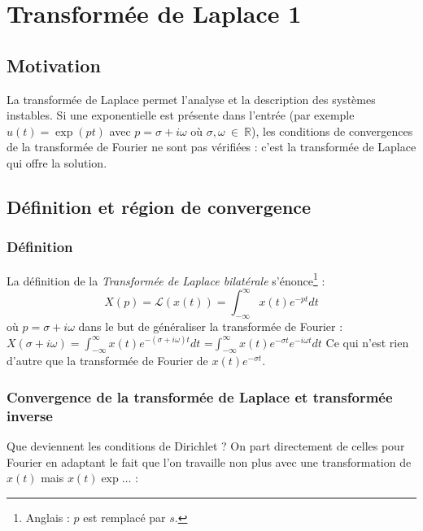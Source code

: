 \chapter{Transformée de Laplace 1}
\section{Motivation}
La transformée de Laplace permet l'analyse et la description des systèmes instables.
Si une exponentielle est présente dans l'entrée (par exemple $u(t) = \exp(pt)$ avec
$p = \sigma + i\omega$ où $\sigma,\omega\ \in\ \mathbb{R}$), les
conditions de convergences de la transformée de Fourier ne sont pas vérifiées : c'est
la transformée de Laplace qui offre la solution.


\section{Définition et région de convergence}
	\subsection{Définition}
	La définition de la \textit{Transformée de Laplace bilatérale} s'énonce\footnote{
	Anglais : $p$ est remplacé par $s$.} :
	\begin{equation}
	X(p) = \mathcal{L}(x(t)) = \int_{-\infty}^\infty x(t)e^{-pt}dt
	\end{equation}
	où $p= \sigma + i\omega$ dans le but de généraliser la transformée de Fourier :
$	X(\sigma+i\omega) = \int_{-\infty}^\infty x(t)e^{-(\sigma+i\omega)t}dt$ =$ 
	\int_{-\infty}^\infty x(t)e^{-\sigma t}e^{-i\omega t}dt
$%
	 Ce qui n'est rien d'autre que la transformée de Fourier de $x(t)e^{-\sigma t}$.


	\subsection{Convergence de la transformée de Laplace et transformée inverse}
	Que deviennent les conditions de Dirichlet ? On part directement de celles pour
	Fourier en adaptant le fait que l'on travaille non plus avec une transformation 
	de $x(t)$ mais $x(t)\exp\dots$ :
	
